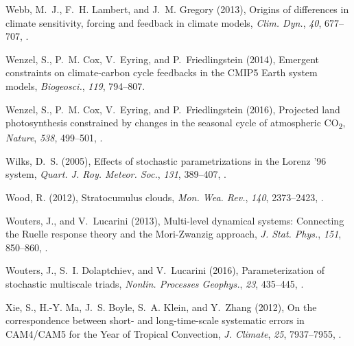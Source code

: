 \documentclass[draft]{agujournal}
\begin{document}
\begin{thebibliography}{196}
Webb, M.~J., F.~H. Lambert, and J.~M. Gregory (2013), Origins of differences in
  climate sensitivity, forcing and feedback in climate models, \textit{Clim.
  Dyn.}, \textit{40}, 677--707, .

Wenzel, S., P.~M. Cox, V.~Eyring, and P.~Friedlingstein (2014), Emergent
  constraints on climate-carbon cycle feedbacks in the {CMIP5} {E}arth system
  models, \textit{Biogeosci.}, \textit{119}, 794--807.

Wenzel, S., P.~M. Cox, V.~Eyring, and P.~Friedlingstein (2016), Projected land
  photosynthesis constrained by changes in the seasonal cycle of atmospheric
  {CO}\textsubscript{2}, \textit{Nature}, \textit{538}, 499--501,
  .

Wilks, D.~S. (2005), Effects of stochastic parametrizations in the {L}orenz '96
  system, \textit{Quart. J. Roy. Meteor. Soc.}, \textit{131}, 389--407,
  .

Wood, R. (2012), Stratocumulus clouds, \textit{Mon. Wea. Rev.}, \textit{140},
  2373--2423, .

Wouters, J., and V.~Lucarini (2013), Multi-level dynamical systems: Connecting
  the {R}uelle response theory and the {M}ori-{Z}wanzig approach, \textit{J.
  Stat. Phys.}, \textit{151}, 850--860, .

Wouters, J., S.~I. Dolaptchiev, and V.~Lucarini (2016), Parameterization of
  stochastic multiscale triads, \textit{Nonlin. Processes Geophys.},
  \textit{23}, 435--445, .

Xie, S., H.-Y. Ma, J.~S. Boyle, S.~A. Klein, and Y.~Zhang (2012), On the
  correspondence between short- and long-time-scale systematic errors in
  {CAM4}/{CAM5} for the {Y}ear of {T}ropical {C}onvection, \textit{J. Climate},
  \textit{25}, 7937--7955, .


\end{thebibliography}
\end{document}

